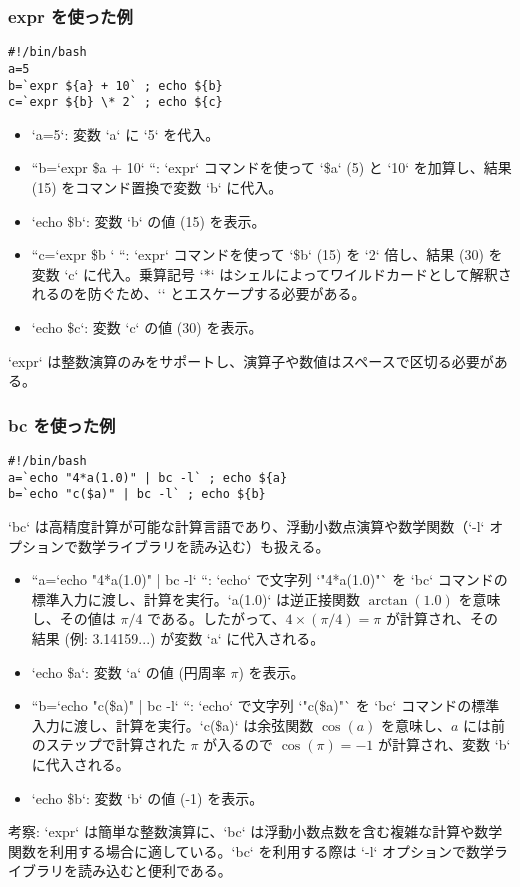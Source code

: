 \documentclass[a4paper,11pt]{jsarticle}
\begin{document}
\subsubsection*{expr を使った例}
\begin{lstlisting}[caption=問14 exprのスクリプト例]
#!/bin/bash
a=5
b=`expr ${a} + 10` ; echo ${b}
c=`expr ${b} \* 2` ; echo ${c}
\end{lstlisting}
\begin{itemize}
    \item `a=5`: 変数 `a` に `5` を代入。
    \item ``b=`expr \${a} + 10` ``: `expr` コマンドを使って `\$a` (5) と `10` を加算し、結果 (15) をコマンド置換で変数 `b` に代入。
    \item `echo \${b}`: 変数 `b` の値 (15) を表示。
    \item ``c=`expr \${b} ` ``: `expr` コマンドを使って `\$b` (15) を `2` 倍し、結果 (30) を変数 `c` に代入。乗算記号 `*` はシェルによってワイルドカードとして解釈されるのを防ぐため、`\*` とエスケープする必要がある。
    \item `echo \${c}`: 変数 `c` の値 (30) を表示。
\end{itemize}
`expr` は整数演算のみをサポートし、演算子や数値はスペースで区切る必要がある。

\subsubsection*{bc を使った例}
\begin{lstlisting}[caption=問14 bcのスクリプト例]
#!/bin/bash
a=`echo "4*a(1.0)" | bc -l` ; echo ${a}
b=`echo "c($a)" | bc -l` ; echo ${b}
\end{lstlisting}
`bc` は高精度計算が可能な計算言語であり、浮動小数点演算や数学関数（`-l` オプションで数学ライブラリを読み込む）も扱える。
\begin{itemize}
    \item ``a=`echo "4*a(1.0)" | bc -l` ``: `echo` で文字列 `"4*a(1.0)"` を `bc` コマンドの標準入力に渡し、計算を実行。`a(1.0)` は逆正接関数 $\arctan(1.0)$ を意味し、その値は $\pi/4$ である。したがって、$4 \times (\pi/4) = \pi$ が計算され、その結果 (例: 3.14159...) が変数 `a` に代入される。
    \item `echo \${a}`: 変数 `a` の値 (円周率 $\pi$) を表示。
    \item ``b=`echo "c(\$a)" | bc -l` ``: `echo` で文字列 `"c(\$a)"` を `bc` コマンドの標準入力に渡し、計算を実行。`c(\$a)` は余弦関数 $\cos(a)$ を意味し、$a$ には前のステップで計算された $\pi$ が入るので $\cos(\pi) = -1$ が計算され、変数 `b` に代入される。
    \item `echo \${b}`: 変数 `b` の値 (-1) を表示。
\end{itemize}
考察: `expr` は簡単な整数演算に、`bc` は浮動小数点数を含む複雑な計算や数学関数を利用する場合に適している。`bc` を利用する際は `-l` オプションで数学ライブラリを読み込むと便利である。
\end{document}
